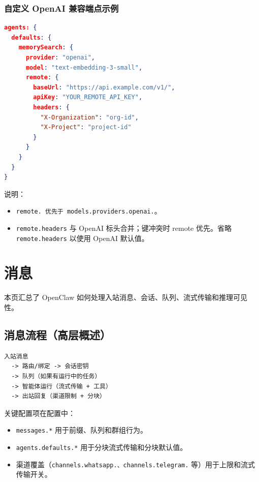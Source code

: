 \subsubsection{自定义 OpenAI 兼容端点示例}


\begin{lstlisting}[language=json]
agents: {
  defaults: {
    memorySearch: {
      provider: "openai",
      model: "text-embedding-3-small",
      remote: {
        baseUrl: "https://api.example.com/v1/",
        apiKey: "YOUR_REMOTE_API_KEY",
        headers: {
          "X-Organization": "org-id",
          "X-Project": "project-id"
        }
      }
    }
  }
}
\end{lstlisting}


说明：

\begin{itemize}
  \item \texttt{remote.\textit{} 优先于 \texttt{models.providers.openai.}}。
  \item \texttt{remote.headers} 与 OpenAI 标头合并；键冲突时 remote 优先。省略 \texttt{remote.headers} 以使用 OpenAI 默认值。
\end{itemize}



\clearpage

\section{消息}


本页汇总了 OpenClaw 如何处理入站消息、会话、队列、流式传输和推理可见性。

\subsection{消息流程（高层概述）}


\begin{lstlisting}
入站消息
  -> 路由/绑定 -> 会话密钥
  -> 队列（如果有运行中的任务）
  -> 智能体运行（流式传输 + 工具）
  -> 出站回复（渠道限制 + 分块）
\end{lstlisting}


关键配置项在配置中：

\begin{itemize}
  \item \texttt{messages.*} 用于前缀、队列和群组行为。
  \item \texttt{agents.defaults.*} 用于分块流式传输和分块默认值。
  \item 渠道覆盖（\texttt{channels.whatsapp.\textit{}、\texttt{channels.telegram.}} 等）用于上限和流式传输开关。
\end{itemize}


